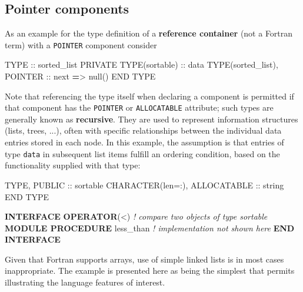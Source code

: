 \documentclass[
]{scrartcl}
\newenvironment{Shaded}{}{}
\newcommand{\CommentTok}[1]{\textcolor[rgb]{0.38,0.63,0.69}{\textit{#1}}}
\newcommand{\DataTypeTok}[1]{\textcolor[rgb]{0.56,0.13,0.00}{#1}}
\newcommand{\KeywordTok}[1]{\textcolor[rgb]{0.00,0.44,0.13}{\textbf{#1}}}
\newcommand{\NormalTok}[1]{#1}
\newcommand{\OperatorTok}[1]{\textcolor[rgb]{0.40,0.40,0.40}{#1}}
\begin{document}
\subsection{Pointer components}\label{pointer-components}

As an example for the type definition of a \textbf{reference container}
(not a Fortran term) with a \texttt{POINTER} component consider

\begin{Shaded}
\begin{Highlighting}[]
\DataTypeTok{TYPE} \DataTypeTok{::}\NormalTok{ sorted\_list}
   \DataTypeTok{PRIVATE}
   \DataTypeTok{TYPE(sortable)} \DataTypeTok{::}\NormalTok{ data}
   \DataTypeTok{TYPE(sorted\_list)}\NormalTok{, }\DataTypeTok{POINTER} \DataTypeTok{::}\NormalTok{ next }\KeywordTok{=}\OperatorTok{\textgreater{}}\NormalTok{ null()}
\DataTypeTok{END TYPE}
\end{Highlighting}
\end{Shaded}

Note that referencing the type itself when declaring a component is
permitted if that component has the \texttt{POINTER} or
\texttt{ALLOCATABLE} attribute; such types are generally known as
\textbf{recursive}. They are used to represent information structures
(lists, trees, ...), often with specific relationships between the
individual data entries stored in each node. In this example, the
assumption is that entries of type \texttt{data} in subsequent list
items fulfill an ordering condition, based on the functionality supplied
with that type:

\begin{Shaded}
\begin{Highlighting}[]
\DataTypeTok{TYPE}\NormalTok{, }\DataTypeTok{PUBLIC} \DataTypeTok{::}\NormalTok{ sortable}
   \DataTypeTok{CHARACTER(len=:)}\NormalTok{, }\DataTypeTok{ALLOCATABLE} \DataTypeTok{::}\NormalTok{ string}
\DataTypeTok{END TYPE}

\KeywordTok{INTERFACE} \KeywordTok{OPERATOR}\NormalTok{(}\OperatorTok{\textless{}}\NormalTok{)         }\CommentTok{! compare two objects of type sortable}
   \KeywordTok{MODULE PROCEDURE}\NormalTok{ less\_than }\CommentTok{! implementation not shown here}
\KeywordTok{END INTERFACE}
\end{Highlighting}
\end{Shaded}

Given that Fortran supports arrays, use of simple linked lists is in
most cases inappropriate. The example is presented here as being the
simplest that permits illustrating the language features of interest.
\end{document}
